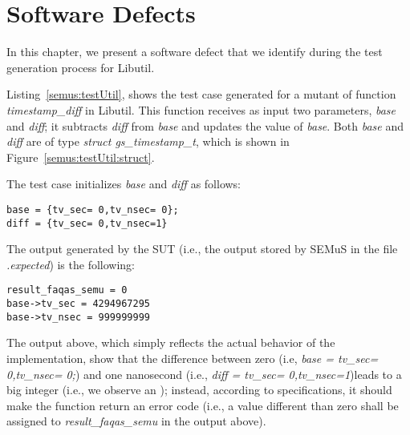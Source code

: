 
\chapter{Software Defects}

In this chapter, we present a software defect that we identify during the test generation process for Libutil.

Listing~\ref{semus:testUtil}, shows the test case generated for a mutant of function \emph{timestamp\_diff} in Libutil.
This function receives as input two parameters, \emph{base} and \emph{diff}; it subtracts \emph{diff} from \emph{base} and updates the value of \emph{base}. Both \emph{base} and \emph{diff} are of type \emph{struct gs\_timestamp\_t}, which is shown in Figure~\ref{semus:testUtil:struct}.


The test case initializes \emph{base} and \emph{diff} as follows:
\begin{verbatim}
base = {tv_sec= 0,tv_nsec= 0};
diff = {tv_sec= 0,tv_nsec=1}
\end{verbatim}

The output generated by the SUT (i.e., the output stored by SEMuS in the file \emph{.expected}) is the following:
\begin{verbatim}
result_faqas_semu = 0
base->tv_sec = 4294967295
base->tv_nsec = 999999999
\end{verbatim}

The output above, which simply reflects the actual behavior of the implementation, show that the difference between zero (i.e, \emph{base = {tv\_sec= 0,tv\_nsec= 0};}) and one nanosecond  (i.e., \emph{diff = {tv\_sec= 0,tv\_nsec=1}})leads to a big integer (i.e., we observe an ); instead, according to specifications, it should make the function return an error code (i.e., a value different than zero shall be assigned to \emph{result\_faqas\_semu} in the output above).




